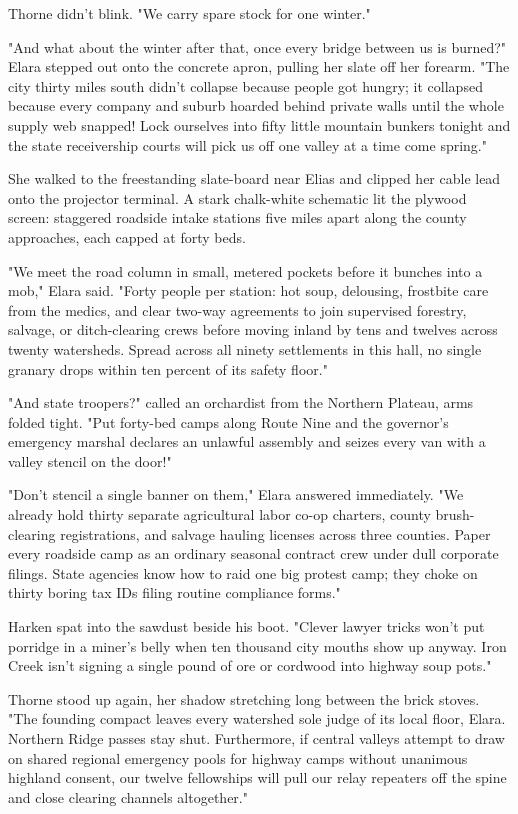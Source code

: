 Thorne didn't blink. "We carry spare stock for one winter."

"And what about the winter after that, once every bridge between us is burned?" Elara stepped out onto the concrete apron, pulling her slate off her forearm. "The city thirty miles south didn't collapse because people got hungry; it collapsed because every company and suburb hoarded behind private walls until the whole supply web snapped! Lock ourselves into fifty little mountain bunkers tonight and the state receivership courts will pick us off one valley at a time come spring."

She walked to the freestanding slate-board near Elias and clipped her cable lead onto the projector terminal. A stark chalk-white schematic lit the plywood screen: staggered roadside intake stations five miles apart along the county approaches, each capped at forty beds.

"We meet the road column in small, metered pockets before it bunches into a mob," Elara said. "Forty people per station: hot soup, delousing, frostbite care from the medics, and clear two-way agreements to join supervised forestry, salvage, or ditch-clearing crews before moving inland by tens and twelves across twenty watersheds. Spread across all ninety settlements in this hall, no single granary drops within ten percent of its safety floor."

"And state troopers?" called an orchardist from the Northern Plateau, arms folded tight. "Put forty-bed camps along Route Nine and the governor's emergency marshal declares an unlawful assembly and seizes every van with a valley stencil on the door!"

"Don't stencil a single banner on them," Elara answered immediately. "We already hold thirty separate agricultural labor co-op charters, county brush-clearing registrations, and salvage hauling licenses across three counties. Paper every roadside camp as an ordinary seasonal contract crew under dull corporate filings. State agencies know how to raid one big protest camp; they choke on thirty boring tax IDs filing routine compliance forms."

Harken spat into the sawdust beside his boot. "Clever lawyer tricks won't put porridge in a miner's belly when ten thousand city mouths show up anyway. Iron Creek isn't signing a single pound of ore or cordwood into highway soup pots."

Thorne stood up again, her shadow stretching long between the brick stoves. "The founding compact leaves every watershed sole judge of its local floor, Elara. Northern Ridge passes stay shut. Furthermore, if central valleys attempt to draw on shared regional emergency pools for highway camps without unanimous highland consent, our twelve fellowships will pull our relay repeaters off the spine and close clearing channels altogether."

